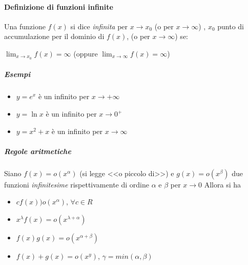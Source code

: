 \documentclass{book}
\begin{document}
\paragraph{Definizione di funzioni infinite}
Una funzione $f(x)$ si dice \textit{infinita} per $x\to x_0$ (o per $x \to \infty$) , $x_0$ punto di accumulazione per il dominio di $f(x)$, (o per $x\to \infty$) se:
\begin {center}
	$\lim_{x\to x_0}f(x)=\infty$ (oppure $\lim_{x\to \infty}f(x)=\infty$)
\end{center}
\subparagraph{Esempi}
\begin{itemize}
	\item $y=e^x$ è un infinito per $x\to +\infty$
	\item $y=\ln{x}$ è un infinito per $x\to 0^+$
	\item $y=x^2+x$ è un infinito per $x\to \infty$
\end{itemize}
\subparagraph{Regole aritmetiche}
Siano $f(x)=o(x^\alpha)$ (si legge <<o piccolo di>>) e $g(x)=o(x^\beta)$ due funzioni \textit{infinitesime} rispettivamente di ordine $\alpha$ e $\beta$ per $x \to 0$ Allora si ha
\begin{itemize}
	\item $cf(x))o(x^\alpha)$, $\forall c \in R$
	\item $x^\lambda f(x)=o(x^{\lambda+\alpha})$
	\item $f(x)g(x)=o(x^{\alpha+\beta})$
	\item $f(x)+g(x)=o(x^y)$, $\gamma=min(\alpha,\beta)$
\end{itemize}
\end{document}
